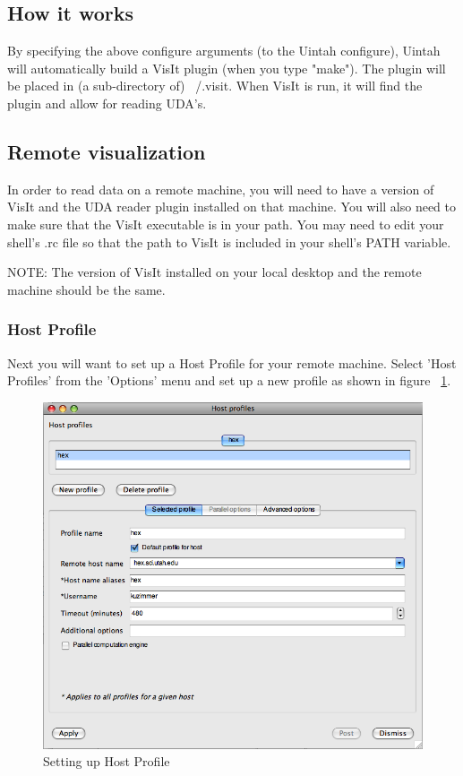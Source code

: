 \documentclass[12pt]{report}
\begin{document}
\subsection{How it works}
By specifying the above configure arguments (to the Uintah configure), Uintah will automatically build a VisIt plugin (when you type "make"). The plugin will be placed in (a sub-directory of) ~/.visit. When VisIt is run, it will find the plugin and allow for reading UDA's.

\subsection{Remote visualization}
In order to read data on a remote machine, you will need to have a version of VisIt and the UDA reader plugin installed on that machine. You will also need to make sure that the VisIt executable is in your path. You may need to edit your shell's .rc file so that the path to VisIt is included in your shell's PATH variable.

NOTE: The version of VisIt installed on your local desktop and the remote machine should be the same.

\subsubsection{Host Profile}
Next you will want to set up a Host Profile for your remote machine. Select 'Host Profiles' from the 'Options' menu and set up a new profile as shown in figure ~\ref{VisItHostProfile}.

\begin{figure}
  \center
  \includegraphics[scale=0.5]{VisItHostProfile.png}
  \caption{Setting up Host Profile}
  \label{VisItHostProfile}
\end{figure}
\end{document}
